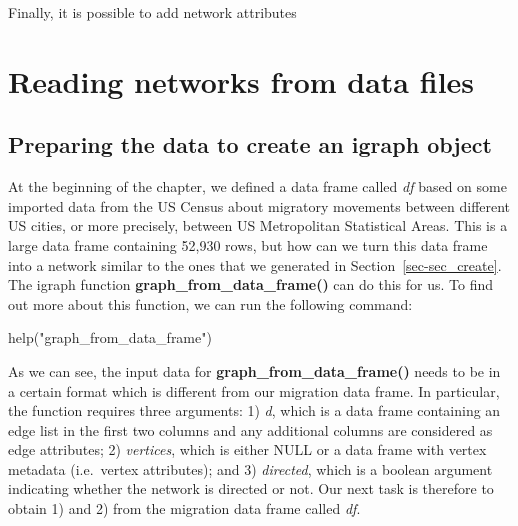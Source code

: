 \documentclass[
  letterpaper,
  DIV=11,
  numbers=noendperiod]{scrreprt}
\newenvironment{Shaded}{\begin{snugshade}}{\end{snugshade}}
\newcommand{\FunctionTok}[1]{\textcolor[rgb]{0.28,0.35,0.67}{#1}}
\newcommand{\NormalTok}[1]{\textcolor[rgb]{0.00,0.23,0.31}{#1}}
\newcommand{\OtherTok}[1]{\textcolor[rgb]{0.00,0.23,0.31}{#1}}
\newcommand{\SpecialCharTok}[1]{\textcolor[rgb]{0.37,0.37,0.37}{#1}}
\newcommand{\StringTok}[1]{\textcolor[rgb]{0.13,0.47,0.30}{#1}}
\begin{document}
Finally, it is possible to add network attributes

\begin{Shaded}
\end{Shaded}

\hypertarget{sec-sec_reading}{%
\section{Reading networks from data files}\label{sec-sec_reading}}

\hypertarget{preparing-the-data-to-create-an-igraph-object}{%
\subsection{Preparing the data to create an igraph
object}\label{preparing-the-data-to-create-an-igraph-object}}

At the beginning of the chapter, we defined a data frame called
\emph{df} based on some imported data from the US Census about migratory
movements between different US cities, or more precisely, between US
Metropolitan Statistical Areas. This is a large data frame containing
52,930 rows, but how can we turn this data frame into a network similar
to the ones that we generated in Section~\ref{sec-sec_create}. The
igraph function \textbf{graph\_from\_data\_frame()} can do this for us.
To find out more about this function, we can run the following command:

\begin{Shaded}
\begin{Highlighting}[]
\FunctionTok{help}\NormalTok{(}\StringTok{"graph\_from\_data\_frame"}\NormalTok{)}
\end{Highlighting}
\end{Shaded}

As we can see, the input data for \textbf{graph\_from\_data\_frame()}
needs to be in a certain format which is different from our migration
data frame. In particular, the function requires three arguments: 1)
\emph{d}, which is a data frame containing an edge list in the first two
columns and any additional columns are considered as edge attributes; 2)
\emph{vertices}, which is either NULL or a data frame with vertex
metadata (i.e.~vertex attributes); and 3) \emph{directed}, which is a
boolean argument indicating whether the network is directed or not. Our
next task is therefore to obtain 1) and 2) from the migration data frame
called \emph{df}.
\end{document}
